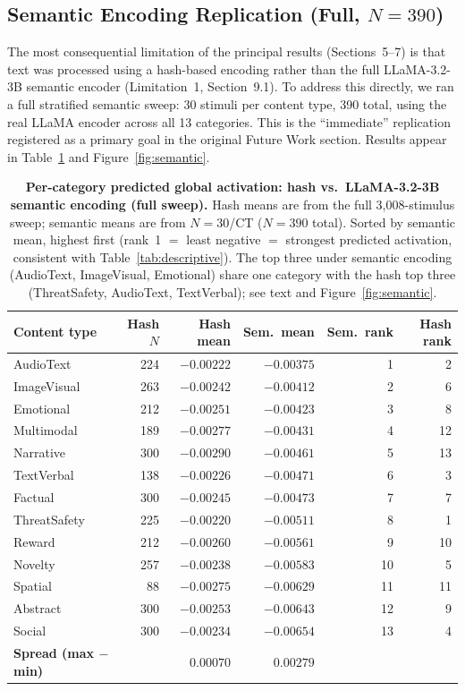\documentclass[11pt,letterpaper]{article}
\begin{document}
\subsection{Semantic Encoding Replication (Full, $N=390$)}\label{sec:semantic}

The most consequential limitation of the principal results (Sections~5--7) is that text was processed using a hash-based encoding rather than the full LLaMA-3.2-3B semantic encoder (Limitation~1, Section~9.1). To address this directly, we ran a full stratified semantic sweep: 30 stimuli per content type, 390 total, using the real LLaMA encoder across all 13 categories. This is the ``immediate'' replication registered as a primary goal in the original Future Work section. Results appear in Table~\ref{tab:semantic} and Figure~\ref{fig:semantic}.

\begin{table}[ht]
\centering
\small
\caption{\textbf{Per-category predicted global activation: hash vs.\ LLaMA-3.2-3B semantic encoding (full sweep).} Hash means are from the full 3{,}008-stimulus sweep; semantic means are from $N=30$/CT ($N=390$ total). Sorted by semantic mean, highest first (rank~1 $=$ least negative $=$ strongest predicted activation, consistent with Table~\ref{tab:descriptive}). The top three under semantic encoding (AudioText, ImageVisual, Emotional) share one category with the hash top three (ThreatSafety, AudioText, TextVerbal); see text and Figure~\ref{fig:semantic}.}
\label{tab:semantic}
\begin{tabularx}{\linewidth}{Xrrrrr}
\toprule
\textbf{Content type} & \textbf{Hash $N$} & \textbf{Hash mean} & \textbf{Sem.\ mean} & \textbf{Sem.\ rank} & \textbf{Hash rank} \\
\midrule
AudioText      & 224 & $-0.00222$ & $-0.00375$ &  1 &  2 \\
ImageVisual    & 263 & $-0.00242$ & $-0.00412$ &  2 &  6 \\
Emotional      & 212 & $-0.00251$ & $-0.00423$ &  3 &  8 \\
Multimodal     & 189 & $-0.00277$ & $-0.00431$ &  4 & 12 \\
Narrative      & 300 & $-0.00290$ & $-0.00461$ &  5 & 13 \\
TextVerbal     & 138 & $-0.00226$ & $-0.00471$ &  6 &  3 \\
Factual        & 300 & $-0.00245$ & $-0.00473$ &  7 &  7 \\
ThreatSafety   & 225 & $-0.00220$ & $-0.00511$ &  8 &  1 \\
Reward         & 212 & $-0.00260$ & $-0.00561$ &  9 & 10 \\
Novelty        & 257 & $-0.00238$ & $-0.00583$ & 10 &  5 \\
Spatial        &  88 & $-0.00275$ & $-0.00629$ & 11 & 11 \\
Abstract       & 300 & $-0.00253$ & $-0.00643$ & 12 &  9 \\
Social         & 300 & $-0.00234$ & $-0.00654$ & 13 &  4 \\
\midrule
\textbf{Spread (max $-$ min)} & & $0.00070$ & $0.00279$ & & \\
\bottomrule
\end{tabularx}
\end{table}
\end{document}
